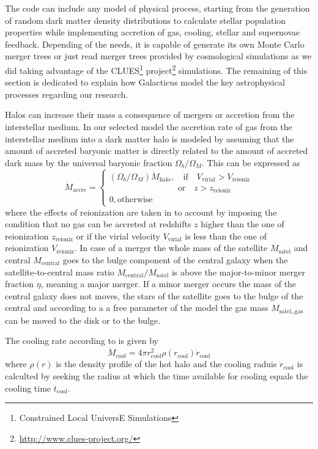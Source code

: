 \documentclass[usenatbib]{mn2e}
\begin{document}
The code can include any model of physical process, starting from the generation of random dark matter density distributions to calculate stellar population 
properties while implementing accretion of gas, cooling, stellar and supernovae feedback. Depending of the needs, it is capable of generate its 
own Monte Carlo merger trees or just read  merger trees provided by cosmological simulations as we did taking advantage of the 
CLUES\footnote{Constrained Local UniversE Simulations} project\footnote{\url{http://www.clues-project.org/}}  simulations. The 
remaining of this section is dedicated to explain how Galacticus model the key astrophysical processes regarding our research.

Halos can increase their mass a consequence of mergers or accretion from the interstellar medium. In our selected model the accretion rate of gas
 from the interstellar medium into a dark matter halo is modeled by assuming that the amount of accreted baryonic  matter is directly related to the 
amount of accreted dark mass by the universal baryonic fraction  $\Omega_b/\Omega_M$. This can be expressed as
\begin{equation}
 \dot{M}_{\text{accre}}=
\begin{cases}
 (\Omega_b/\Omega_M)\dot{M}_{\text{halo}},\quad \text{if} \quad V_{\text{virial}}>V_{\text{reioniz}}\\
\qquad \qquad \qquad \qquad \text{or} \quad z>z_{\text{reioniz}}\\
0, \text{otherwise}
\end{cases}
\end{equation}
where the effects of reionization are taken in to account by  imposing the condition that no gas can be accreted at  redshifts $z$ higher than the one of 
reionization $z_{\text{reioniz}}$ or if the virial velocity $V_{\text{virial}}$ is less than the one of reionization $V_{\text{reioniz}}$. 
In case of a merger the whole mass of the satellite $M_{\text{satel}}$ and central $M_{\text{central}}$ goes to the bulge component of the central galaxy
when the satellite-to-central mass ratio $M_{\text{central}}/M_{\text{satel}}$ is above the major-to-minor merger fraction $\eta$, meaning  a major merger.
If a minor merger occurs the mass of the central galaxy does not moves, the stars of the satellite goes to the bulge of the central and according to a 
a free parameter of the model the gas mass $M_{\text{satel.,gas}}$ can be moved to the disk or to the bulge.

The cooling rate according to \cite{1991ApJ...379...52W} is given by
\begin{equation}
 \dot{M}_{cool}=4\pi r^2_{\text{cool}} \rho (r_{\text{cool}}) \dot{r}_{\text{cool}}
\end{equation}
where  $\rho(r)$ is the density profile of the hot halo and the cooling raduis $\dot{r}_{\text{cool}}$ is calculted by seeking the radius at which the 
time available for cooling equals the cooling time $t_{\text{cool}}$. 
\end{document}
